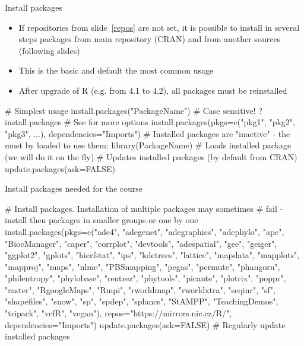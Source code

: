 \documentclass[compress, xelatex, 11pt, xcolor=svgnames, aspectratio=169,
	hyperref={
		bookmarks=true,
		unicode=true,
		colorlinks=true,
		pdftitle={Molecular data in R},
		plainpages=false,
		pdfauthor={Vojtech Zeisek},
		pdfsubject={Course about phylogeny and evolution in R},
		pdfcreator={XeLaTeX},
		pdfkeywords={R, evolution, phylogeny, molecular data},
		linkcolor=Crimson, %
		anchorcolor=Magenta, %
		citecolor=Magenta, %
		filecolor=Magenta, %
		menucolor=Magenta, %
		urlcolor=DodgerBlue, %
		},
	url={hyphens, lowtilde} %
	]{beamer}
\begin{document}
\begin{frame}[fragile]{Install packages}
	\begin{itemize}
		\item If repositories from slide~\ref{repos} are not set, it is possible to install in several steps packages from main repository (CRAN) and from another sources (following slides)
		\item This is the basic and default the most common usage
		\item After upgrade of R (e.g. from 4.1 to 4.2), all packages must be reinstalled
	\end{itemize}
	\begin{spluscode}
    # Simplest usage
    install.packages("PackageName") # Case sensitive!
    ?install.packages # See for more options
    install.packages(pkgs=c("pkg1", "pkg2", "pkg3", ...),
      dependencies="Imports")
    # Installed packages are "inactive" - the must by loaded to use them:
    library(PackageName) # Loads installed package (we will do it on the fly)
    # Updates installed packages (by default from CRAN)
    update.packages(ask=FALSE)
	\end{spluscode}
\end{frame}

\begin{frame}[fragile]{Install packages needed for the course}
	\begin{spluscode}
    # Install packages. Installation of multiple packages may sometimes
    # fail - install then packages in smaller groups or one by one
    install.packages(pkgs=c("ade4", "adegenet", "adegraphics", "adephylo",
      "ape", "BiocManager", "caper", "corrplot", "devtools", "adespatial",
      "gee", "geiger", "ggplot2", "gplots", "hierfstat", "ips", "kdetrees",
      "lattice", "mapdata", "mapplots", "mapproj", "maps", "nlme",
      "PBSmapping", "pegas", "permute", "phangorn", "philentropy",
      "phylobase", "rentrez", "phytools", "picante", "plotrix", "poppr",
      "raster", "RgoogleMaps", "Rmpi", "rworldmap", "rworldxtra", "seqinr",
      "sf", "shapefiles", "snow", "sp", "spdep", "splancs", "StAMPP",
      "TeachingDemos", "tripack", "vcfR", "vegan"),
      repos="https://mirrors.nic.cz/R/", dependencies="Imports")
    update.packages(ask=FALSE) # Regularly update installed packages
	\end{spluscode}
\end{frame}
\end{document}
